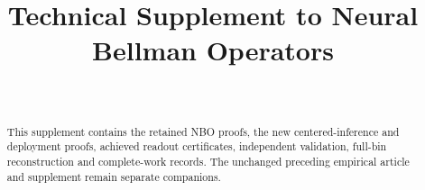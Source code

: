 \documentclass[ecta,nameyear,draft]{econsocart}
\begin{document}
\begin{frontmatter}
\title{Technical Supplement to Neural Bellman Operators}
\begin{aug}
\author[id=au1,addressref={add1}]{~}
\address[id=add1]{Peking University}
\end{aug}
\begin{abstract}
This supplement contains the retained NBO proofs, the new centered-inference and deployment proofs, achieved readout certificates, independent validation, full-bin reconstruction and complete-work records. The unchanged preceding empirical article and supplement remain separate companions.
\end{abstract}
\end{frontmatter}






\end{document}
